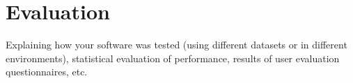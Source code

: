 \chapter{Evaluation}

Explaining how your software was tested (using different datasets or in different environments), statistical evaluation of performance, results of user evaluation questionnaires, etc.